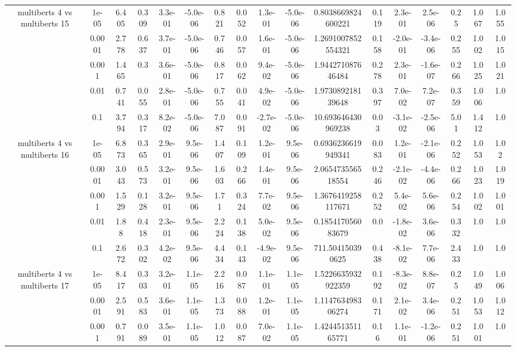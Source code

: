 \begin{tabular}{|c|c|c|c|c|c|c|c|c|c|c|c|c|c|c|c|c|}
\hline
\multirow{5}{*}{multiberts 4 vs multiberts 15} & 1e-05 & 6.405 & 0.309 & 3.3e-01 & -5.0e-06 & 0.821 & 0.052 & 1.3e-01 & -5.0e-06 & 0.8038669824600221 & 0.119 & 2.3e-01 & 2.5e-06 & 0.25 & 1.067 & 1.055 \\
 & 0.0001 & 2.778 & 0.637 & 3.7e-01 & -5.0e-06 & 0.746 & 0.057 & 1.6e-01 & -5.0e-06 & 1.2691007852554321 & 0.158 & -2.0e-01 & -3.4e-06 & 0.255 & 1.002 & 1.015 \\
 & 0.001 & 1.465 & 0.3 & 3.6e-01 & -5.0e-06 & 0.817 & 0.062 & 9.4e-02 & -5.0e-06 & 1.944271087646484 & 0.278 & 2.3e-01 & -1.6e-07 & 0.266 & 1.025 & 1.021 \\
 & 0.01 & 0.741 & 0.055 & 2.8e-01 & -5.0e-06 & 0.755 & 0.041 & 4.9e-02 & -5.0e-06 & 1.973089218139648 & 0.397 & 7.0e-02 & 7.2e-07 & 0.359 & 1.006 & 1.0 \\
 & 0.1 & 3.794 & 0.317 & 8.2e-02 & -5.0e-06 & 7.087 & 0.091 & -2.7e-02 & -5.0e-06 & 10.693646430969238 & 0.03 & -3.1e-02 & -2.5e-06 & 5.01 & 1.412 & 1.0 \\
\hline
\multirow{5}{*}{multiberts 4 vs multiberts 16} & 1e-05 & 6.873 & 0.365 & 2.9e-01 & 9.5e-06 & 1.407 & 0.109 & 1.2e-01 & 9.5e-06 & 0.6936236619949341 & 0.083 & 1.2e-01 & -2.1e-06 & 0.252 & 1.053 & 1.02 \\
 & 0.0001 & 3.043 & 0.573 & 3.2e-01 & 9.5e-06 & 1.603 & 0.266 & 1.4e-01 & 9.5e-06 & 2.065473556518554 & 0.246 & -2.1e-02 & -4.4e-06 & 0.266 & 1.023 & 1.019 \\
 & 0.001 & 1.529 & 0.128 & 3.2e-01 & 9.5e-06 & 1.71 & 0.324 & 7.7e-02 & 9.5e-06 & 1.3676419258117671 & 0.252 & 5.4e-02 & 5.6e-06 & 0.254 & 1.002 & 1.001 \\
 & 0.01 & 1.88 & 0.418 & 2.3e-01 & 9.5e-06 & 2.224 & 0.138 & 5.0e-02 & 9.5e-06 & 0.185417056083679 & 0.0 & -1.8e-02 & 3.6e-06 & 0.332 & 1.0 & 1.0 \\
 & 0.1 & 2.672 & 0.302 & 4.2e-02 & 9.5e-06 & 4.434 & 0.143 & -4.9e-02 & 9.5e-06 & 711.504150390625 & 0.438 & -8.1e-02 & 7.7e-06 & 2.433 & 1.0 & 1.0 \\
\hline
\multirow{5}{*}{multiberts 4 vs multiberts 17} & 1e-05 & 8.417 & 0.303 & 3.2e-01 & 1.1e-05 & 2.216 & 0.087 & 1.1e-01 & 1.1e-05 & 1.5226635932922359 & 0.192 & -8.3e-02 & 8.8e-07 & 0.25 & 1.049 & 1.006 \\
 & 0.0001 & 2.591 & 0.583 & 3.6e-01 & 1.1e-05 & 1.373 & 0.088 & 1.2e-01 & 1.1e-05 & 1.114763498306274 & 0.171 & 2.1e-02 & 3.4e-06 & 0.251 & 1.053 & 1.012 \\
 & 0.001 & 0.791 & 0.089 & 3.5e-01 & 1.1e-05 & 1.012 & 0.087 & 7.0e-02 & 1.1e-05 & 1.424451351165771 & 0.16 & 1.1e-01 & -1.2e-06 & 0.251 & 1.001 & 1.0 \\

\end{tabular}
